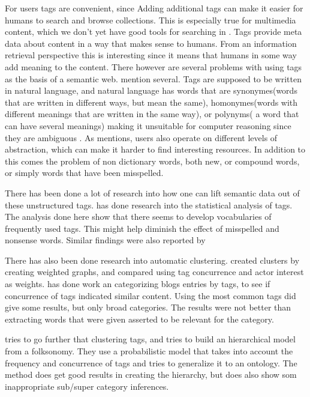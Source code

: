 For users tags are convenient, since Adding additional tags can make it easier for humans to search and browse collections. This is especially true for multimedia content, which we don't yet have good tools for searching in \citep{Weinberger2008}.
Tags provide meta data about content in a way that makes sense to humans. From an information retrieval perspective this is interesting since it means that humans in some way add meaning to the content.
There however are several problems with using tags as the basis of a semantic web. \citet{Tang2009} mention several. 
Tags are supposed to be written in natural language, and natural language has words that are synonymes(words that are written in different ways, 
but mean the same), homonymes(words with different meanings that are written in the same way), or polynyms( a word that can have several meanings) 
making it unsuitable for computer reasoning since they are ambiguous \citep{Passant2008}. 
As \citet{Golder2005} mentions, users also operate on different levels of abstraction, which can make it harder to find interesting resources.
In addition to this comes the problem of non dictionary words, both new, or compound words, or simply words that have been misspelled\citep{Tonkin2006}.


There has been done a lot of research into how one can lift semantic data out of these unstructured tags.
\citet{Golder2005} has done research into the statistical analysis of tags. 
The analysis done here show that there seems to develop vocabularies of frequently used tags. 
This might help diminish the effect of misspelled and nonsense words. Similar findings were also reported by \citep{Shirky2007}

There has also been done research into automatic clustering. 
\citet{Mika2005} created clusters by creating weighted graphs, and compared using tag concurrence and actor interest as weights.  
\citet{Brooks2006} has done work an categorizing blogs entries by tags, to see if concurrence of tags indicated similar content. 
Using the most common tags did give some results, but only broad categories. The results were not better than extracting words that were given asserted to be relevant for the category.

\citep{Tang2009} tries to go further that clustering tags, and tries to build an hierarchical model from a folksonomy. 
They use a probabilistic model that takes into account the frequency and concurrence of tags and tries to generalize it to an ontology. 
The method does get good results in creating the hierarchy, but does also show som inappropriate sub/super category inferences.

